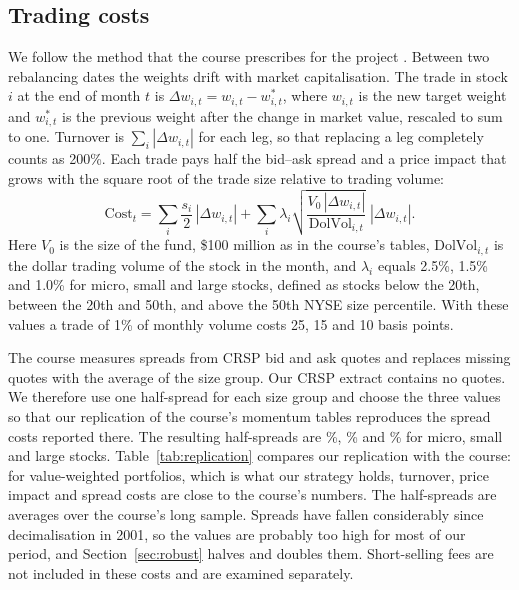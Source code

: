 \documentclass[12pt,a4paper]{article}
\begin{document}
\subsection{Trading costs}
We follow the method that the course prescribes for the project \citep{goyal2026}. Between two rebalancing dates the weights drift with market capitalisation. The trade in stock $i$ at the end of month $t$ is $\Delta w_{i,t}=w_{i,t}-w^{*}_{i,t}$, where $w_{i,t}$ is the new target weight and $w^{*}_{i,t}$ is the previous weight after the change in market value, rescaled to sum to one. Turnover is $\sum_i|\Delta w_{i,t}|$ for each leg, so that replacing a leg completely counts as 200\%. Each trade pays half the bid--ask spread and a price impact that grows with the square root of the trade size relative to trading volume:
\begin{equation}
\text{Cost}_t=\sum_i \frac{s_i}{2}\,|\Delta w_{i,t}| + \sum_i \lambda_i\sqrt{\frac{V_0\,|\Delta w_{i,t}|}{\text{DolVol}_{i,t}}}\;|\Delta w_{i,t}| .
\end{equation}
Here $V_0$ is the size of the fund, \$100 million as in the course's tables, $\text{DolVol}_{i,t}$ is the dollar trading volume of the stock in the month, and $\lambda_i$ equals 2.5\%, 1.5\% and 1.0\% for micro, small and large stocks, defined as stocks below the 20th, between the 20th and 50th, and above the 50th NYSE size percentile. With these values a trade of 1\% of monthly volume costs 25, 15 and 10 basis points.

The course measures spreads from CRSP bid and ask quotes and replaces missing quotes with the average of the size group. Our CRSP extract contains no quotes. We therefore use one half-spread for each size group and choose the three values so that our replication of the course's momentum tables reproduces the spread costs reported there. The resulting half-spreads are \hsmicro\%, \hssmall\% and \hslarge\% for micro, small and large stocks. Table~\ref{tab:replication} compares our replication with the course: for value-weighted portfolios, which is what our strategy holds, turnover, price impact and spread costs are close to the course's numbers. The half-spreads are averages over the course's long sample. Spreads have fallen considerably since decimalisation in 2001, so the values are probably too high for most of our period, and Section~\ref{sec:robust} halves and doubles them. Short-selling fees are not included in these costs and are examined separately.
\end{document}
